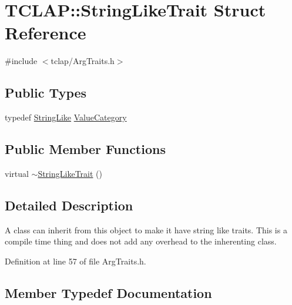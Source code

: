 \hypertarget{struct_t_c_l_a_p_1_1_string_like_trait}{}\section{T\+C\+L\+A\+P\+:\+:String\+Like\+Trait Struct Reference}
\label{struct_t_c_l_a_p_1_1_string_like_trait}


{\ttfamily \#include $<$tclap/\+Arg\+Traits.\+h$>$}

\subsection*{Public Types}
\begin{DoxyCompactItemize}
\item 
typedef \hyperlink{struct_t_c_l_a_p_1_1_string_like}{String\+Like} \hyperlink{struct_t_c_l_a_p_1_1_string_like_trait_a7a081c80b731414dcad1b50cf80b7433}{Value\+Category}
\end{DoxyCompactItemize}
\subsection*{Public Member Functions}
\begin{DoxyCompactItemize}
\item 
virtual \hyperlink{struct_t_c_l_a_p_1_1_string_like_trait_ad7353733df8665d257bd5c4af43d822d}{$\sim$\+String\+Like\+Trait} ()
\end{DoxyCompactItemize}


\subsection{Detailed Description}
A class can inherit from this object to make it have string like traits. This is a compile time thing and does not add any overhead to the inherenting class. 

Definition at line 57 of file Arg\+Traits.\+h.



\subsection{Member Typedef Documentation}
\hypertarget{struct_t_c_l_a_p_1_1_string_like_trait_a7a081c80b731414dcad1b50cf80b7433}{}
